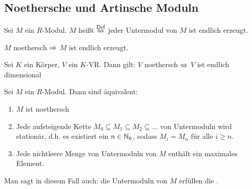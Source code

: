 \subsection{Noethersche und Artinsche Moduln}
\begin{df}\label{df3.1}
	Sei $M$ ein $R$-Modul. $M$ heißt  $\overset{\text{Def}}{\Leftrightarrow}$ jeder Untermodul von $M$ ist endlich erzeugt.
\end{df}
\begin{anm}
	$M$ noethersch $\Rightarrow $ $M$ ist endlich erzeugt.
\end{anm}
\begin{bsp}
	Sei $K$ ein Körper, $V$ ein $K$-VR. Dann gilt: $V$ noethersch $\Leftrightarrow$ $V$ ist endlich dimensional
\end{bsp}
\begin{sa}
	Sei $M$ ein $R$-Modul. Dann sind äquivalent:
	\begin{enumerate}[label= \roman*)]
		\item $M$ ist noethersch
		\item Jede aufsteigende Kette $M_0 \subseteq M_1 \subseteq M_2 \subseteq \dots $ von Untermoduln wird stationär, d.h. es existiert ein $ n \in \mathbb{N}_0$, sodass $M_i = M_n$ für alle $i \geq n $.
		\item Jede nichtleere Menge von Untermoduln von $M$ enthält ein maximales Element.
	\end{enumerate}
	Man sagt in diesem Fall auch: die Untermoduln von $M$ erfüllen die .
\end{sa}
